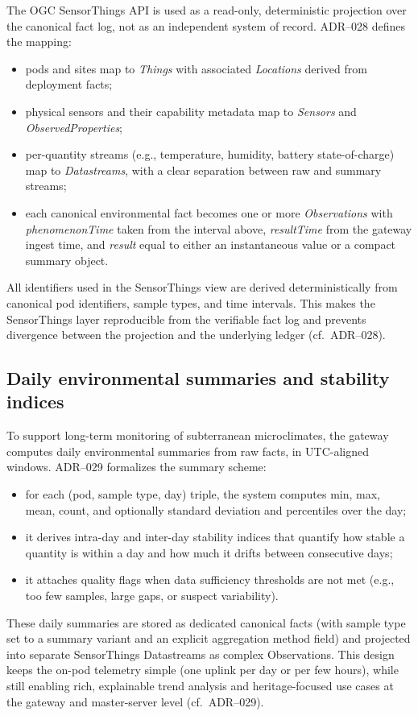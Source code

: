 The OGC SensorThings API is used as a read-only, deterministic projection over the canonical fact log, not as an independent system of record. ADR--028 defines the mapping:
\begin{itemize}
  \item pods and sites map to \emph{Things} with associated \emph{Locations} derived from deployment facts;
  \item physical sensors and their capability metadata map to \emph{Sensors} and \emph{ObservedProperties};
  \item per-quantity streams (e.g., temperature, humidity, battery state-of-charge) map to \emph{Datastreams}, with a clear separation between raw and summary streams;
  \item each canonical environmental fact becomes one or more \emph{Observations} with \emph{phenomenonTime} taken from the interval above, \emph{resultTime} from the gateway ingest time, and \emph{result} equal to either an instantaneous value or a compact summary object.
\end{itemize}

All identifiers used in the SensorThings view are derived deterministically from canonical pod identifiers, sample types, and time intervals. This makes the SensorThings layer reproducible from the verifiable fact log and prevents divergence between the projection and the underlying ledger (cf.~ADR--028).

\subsection{Daily environmental summaries and stability indices}
\label{subsec:env_daily_summaries}

To support long-term monitoring of subterranean microclimates, the gateway computes daily environmental summaries from raw facts, in UTC-aligned windows. ADR--029 formalizes the summary scheme:
\begin{itemize}
  \item for each (pod, sample type, day) triple, the system computes min, max, mean, count, and optionally standard deviation and percentiles over the day;
  \item it derives intra-day and inter-day stability indices that quantify how stable a quantity is within a day and how much it drifts between consecutive days;
  \item it attaches quality flags when data sufficiency thresholds are not met (e.g., too few samples, large gaps, or suspect variability).
\end{itemize}

These daily summaries are stored as dedicated canonical facts (with sample type set to a summary variant and an explicit aggregation method field) and projected into separate SensorThings Datastreams as complex Observations. This design keeps the on-pod telemetry simple (one uplink per day or per few hours), while still enabling rich, explainable trend analysis and heritage-focused use cases at the gateway and master-server level (cf.~ADR--029).
